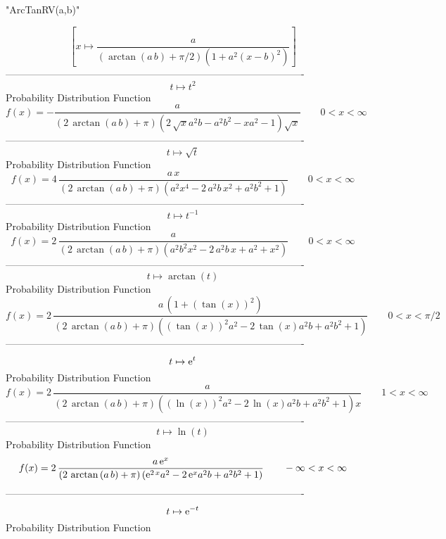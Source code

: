\documentclass[12pt]{article}
\begin{document}
 
                               "ArcTanRV(a,b)"

$$[x\mapsto {\frac {a}{ \left( \arctan \left( a\,b \right) +\pi/2
 \right)  \left( 1+{a}^{2} \left( x-b \right) ^{2} \right) }}]
$$-------------------------------------------------------------------------------------------  \\$$t\mapsto {t}^{2}
$$Probability Distribution Function 
$$  f(x)=-{\frac {a}{ \left( 2\,\arctan \left( a\,b \right) +\pi \right) 
 \left( 2\,\sqrt {x}{a}^{2}b-{a}^{2}{b}^{2}-x{a}^{2}-1 \right) \sqrt {
x}}}
 \qquad0
 < x < \infty 
$$-------------------------------------------------------------------------------------------  \\$$t\mapsto \sqrt {t}
$$Probability Distribution Function 
$$  f(x)=4\,{\frac {a\,x}{ \left( 2\,\arctan \left( a\,b \right) +\pi \right) 
 \left( {a}^{2}{x}^{4}-2\,{a}^{2}b\,{x}^{2}+{a}^{2}{b}^{2}+1 \right) }
}
 \qquad0
 < x < \infty 
$$-------------------------------------------------------------------------------------------  \\$$t\mapsto {t}^{-1}
$$Probability Distribution Function 
$$  f(x)=2\,{\frac {a}{ \left( 2\,\arctan \left( a\,b \right) +\pi \right) 
 \left( {a}^{2}{b}^{2}{x}^{2}-2\,{a}^{2}b\,x+{a}^{2}+{x}^{2} \right) }
}
 \qquad0
 < x < \infty 
$$-------------------------------------------------------------------------------------------  \\$$t\mapsto \arctan \left( t \right) 
$$Probability Distribution Function 
$$  f(x)=2\,{\frac {a\, \left( 1+ \left( \tan \left( x \right)  \right) ^{2}
 \right) }{ \left( 2\,\arctan \left( a\,b \right) +\pi \right) 
 \left(  \left( \tan \left( x \right)  \right) ^{2}{a}^{2}-2\,\tan
 \left( x \right) {a}^{2}b+{a}^{2}{b}^{2}+1 \right) }}
 \qquad0
 < x < \pi/2
$$-------------------------------------------------------------------------------------------  \\$$t\mapsto {{\rm e}^{t}}
$$Probability Distribution Function 
$$  f(x)=2\,{\frac {a}{ \left( 2\,\arctan \left( a\,b \right) +\pi \right) 
 \left(  \left( \ln  \left( x \right)  \right) ^{2}{a}^{2}-2\,\ln 
 \left( x \right) {a}^{2}b+{a}^{2}{b}^{2}+1 \right) x}}
 \qquad1
 < x < \infty 
$$-------------------------------------------------------------------------------------------  \\$$t\mapsto \ln  \left( t \right) 
$$Probability Distribution Function 
$$  f(x)=2\,{\frac {a\,{{\rm e}^{x}}}{ \left( 2\,\arctan \left( a\,b \right) +
\pi \right)  \left( {{\rm e}^{2\,x}}{a}^{2}-2\,{{\rm e}^{x}}{a}^{2}b+{
a}^{2}{b}^{2}+1 \right) }}
 \qquad-\infty 
 < x < \infty 
$$-------------------------------------------------------------------------------------------  \\$$t\mapsto {{\rm e}^{-t}}
$$Probability Distribution Function 
\end{document}
